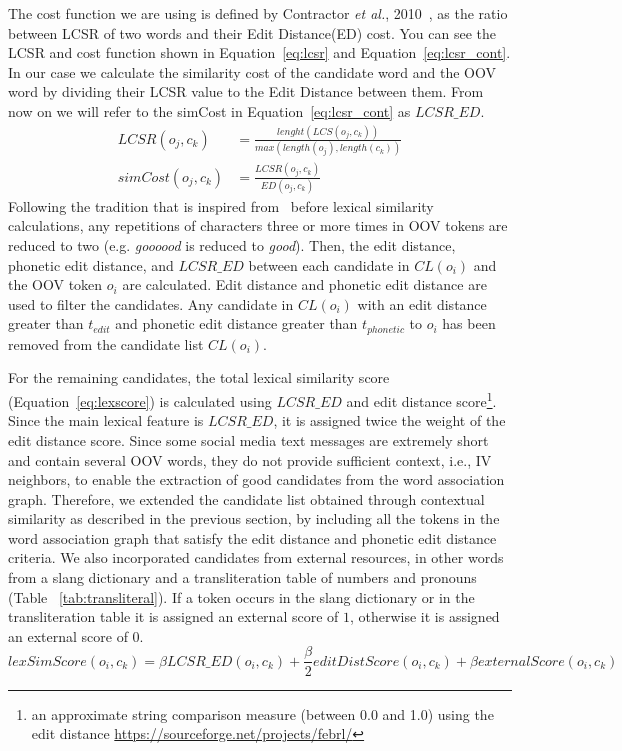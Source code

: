 \documentclass[a4paper,onesided,12pt]{report}
\begin{document}
The cost function we are using is defined by Contractor \textit{et al.}, 2010~\cite{Contractor:2010:UCN:1944566.1944588}, as the ratio between LCSR of two words and their Edit Distance(ED) cost. You can see the LCSR and cost function shown in Equation~\ref{eq:lcsr} and Equation~\ref{eq:lcsr_cont}. In our case we calculate the similarity cost of the candidate word and the OOV word by dividing their LCSR value to the Edit Distance between them. From now on we will refer to the simCost in Equation~\ref{eq:lcsr_cont} as $LCSR\_ED$.
\begin{align}
LCSR(o_j,c_k) &= \frac{lenght(LCS(o_j,c_k))}{max(length(o_j),length(c_k))} \label{eq:lcsr}      \\
simCost (o_j,c_k) &= \frac{LCSR(o_j,c_k)}{ED(o_j,c_k)} \label{eq:lcsr_cont}
\end{align}
Following the tradition that is inspired from~\cite{Kaufmann2010} before lexical similarity calculations, any repetitions of characters three or more times in OOV tokens are reduced to two (e.g. \emph{goooood} is reduced to \emph{good}). Then, the edit distance, phonetic edit distance, and $LCSR\_ED$ between each candidate in $CL(o_{i})$ and the OOV token $o_i$ are calculated. Edit distance and phonetic edit distance are used to filter the candidates. Any candidate in $CL(o_{i})$ with an edit distance greater than $t_{edit}$ and phonetic edit distance greater than $t_{phonetic}$ to $o_i$ has been removed from the candidate list $CL(o_{i})$.

For the remaining candidates, the total lexical similarity score (Equation~\ref{eq:lexscore}) is calculated using $LCSR\_ED$ and edit distance score\footnote{an approximate string comparison measure (between 0.0 and 1.0) using the edit distance \url{https://sourceforge.net/projects/febrl/}}. Since the main lexical feature is $LCSR\_ED$, it is assigned twice the weight of the edit distance score. Since some social media text messages are extremely short and contain several OOV words, they do not provide sufficient context, i.e., IV neighbors, to enable the extraction of good candidates from the word association graph. Therefore, we extended the candidate list obtained through contextual similarity as described in the previous section, by including all the tokens in the word association graph that satisfy the edit distance and phonetic edit distance criteria. We also incorporated candidates from external resources, in other words from a slang dictionary and a transliteration table of numbers and pronouns (Table ~\ref{tab:transliteral}). If a token occurs in the slang dictionary or in the transliteration table it is assigned an external score of $1$, otherwise it is assigned an external score of $0$.
\begin{equation}
lexSimScore(o_i,c_k) = \beta LCSR\_ED(o_i,c_k) + \frac{\beta} 2 editDistScore(o_i,c_k) + \beta externalScore(o_i,c_k)
\label{eq:lexscore}
\end{equation}
\end{document}
